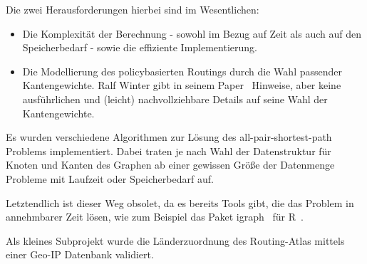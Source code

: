 Die zwei Herausforderungen hierbei sind im Wesentlichen:
\begin{itemize}
  \item Die Komplexität der Berechnung - sowohl im Bezug auf Zeit als auch auf den Speicherbedarf - sowie die effiziente Implementierung.
  \item Die Modellierung des policybasierten Routings durch die Wahl passender Kantengewichte. Ralf Winter gibt in seinem Paper~\cite{Winter:2009:MIR:1577959.1577976} Hinweise, aber keine ausführlichen und (leicht) nachvollziehbare Details auf seine Wahl der Kantengewichte.
\end{itemize}

Es wurden verschiedene Algorithmen zur Lösung des all-pair-shortest-path Problems implementiert.
Dabei traten je nach Wahl der Datenstruktur für Knoten und Kanten des Graphen ab einer gewissen Größe der Datenmenge Probleme mit Laufzeit oder Speicherbedarf auf.

Letztendlich ist dieser Weg obsolet, da es bereits Tools gibt, die das Problem in annehmbarer Zeit lösen, wie zum Beispiel das Paket igraph~\cite{r-igraph} für R~\cite{r}.

Als kleines Subprojekt wurde die Länderzuordnung des Routing-Atlas mittels einer Geo-IP Datenbank validiert.
